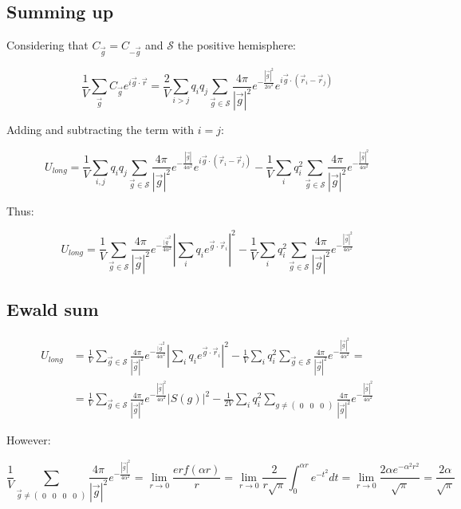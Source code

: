 	\subsection{Summing up}
	Considering that $C_{\vec{g}} = C_{-\vec{g}}$ and $\mathcal{S}$ the positive hemisphere:

	$$\frac{1}{V}\sum\limits_{\vec{g}}C_{\vec{g}}e^{i\vec{g}\cdot\vec{r}} = \frac{2}{V}\sum\limits_{i>j}q_iq_j\sum\limits_{\vec{g}\in\mathcal{S}}\frac{4\pi}{|\vec{g}|^2}e^{-\frac{|\vec{g}|^2}{2\alpha^2}}e^{i\vec{g}\cdot(\vec{r}_i-\vec{r}_j)}$$

	Adding and subtracting the term with $i = j$:

	$$U_{long} = \frac{1}{V}\sum\limits_{i, j}q_iq_j\sum\limits_{\vec{g}\in\mathcal{S}}\frac{4\pi}{|\vec{g}|^2}e^{-\frac{|\vec{g}|}{4\alpha^2}}e^{i\vec{g}\cdot(\vec{r}_i-\vec{r}_j)}-\frac{1}{V}\sum\limits_iq_i^2\sum\limits_{\vec{g}\in\mathcal{S}}\frac{4\pi}{|\vec{g}|^2}e^{-\frac{|\vec{g}|^2}{4\alpha^2}}$$

	Thus:

	$$U_{long} = \frac{1}{V}\sum\limits_{\vec{g}\in\mathcal{S}}\frac{4\pi}{|\vec{g}|^2}e^{-\frac{|\vec{g}^2}{4\alpha^2}}|\sum\limits_{i}q_ie^{\vec{g}\cdot\vec{r}_i}|^2 - \frac{1}{V}\sum\limits_iq_i^2\sum\limits_{\vec{g}\in\mathcal{S}}\frac{4\pi}{|\vec{g}|^2}e^{-\frac{|\vec{g}|^2}{4\alpha^2}}$$

	\subsection{Ewald sum}

	\begin{align*}
		U_{long} &= \frac{1}{V}\sum\limits_{\vec{g}\in\mathcal{S}}\frac{4\pi}{|\vec{g}|^2}e^{-\frac{|\vec{g}^2}{4\alpha^2}}|\sum\limits_{i}q_ie^{\vec{g}\cdot\vec{r}_i}|^2 - \frac{1}{V}\sum\limits_iq_i^2\sum\limits_{\vec{g}\in\mathcal{S}}\frac{4\pi}{|\vec{g}|^2}e^{-\frac{|\vec{g}|^2}{4\alpha^2}} = \\
						 &= \frac{1}{V}\sum\limits_{\vec{g}\in\mathcal{S}}\frac{4\pi}{|\vec{g}|^2}e^{-\frac{|\vec{g}|^2}{4\alpha^2}}|S(g)|^2-\frac{1}{2V}\sum\limits_{i}q_i^2\sum\limits_{g\neq\begin{pmatrix} 0&0&0\end{pmatrix}}\frac{4\pi}{|\vec{g}|^2}e^{-\frac{|\vec{g}|^2}{4\alpha^2}}
	\end{align*}

	However:

	$$\frac{1}{V}\sum\limits_{\vec{g}\neq\begin{pmatrix}0&0&0&0\end{pmatrix}}\frac{4\pi}{|\vec{g}|^2}e^{-\frac{|\vec{g}|^2}{4\alpha^2}} = \lim\limits_{r\rightarrow 0}\frac{erf(\alpha r)}{r} = \lim\limits_{r\rightarrow 0}\frac{2}{r\sqrt{\pi}}\int_0^{\alpha r}e^{-t^2}dt = \lim\limits_{r\rightarrow 0}\frac{2\alpha e^{-\alpha^2r^2}}{\sqrt{\pi}} = \frac{2\alpha}{\sqrt{\pi}}$$

